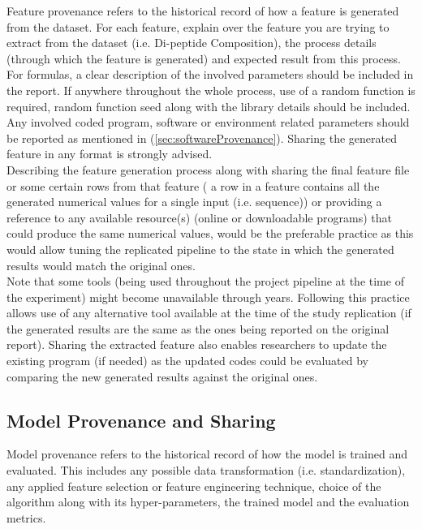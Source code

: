    Feature provenance refers to the historical record of how a feature is generated from the dataset. For each feature, explain 
    over the feature you are trying to extract from the dataset (i.e. Di-peptide Composition), the process details (through which the 
    feature is generated) and expected result from this process. For formulas, a clear description of the involved parameters should be 
    included in the report. If anywhere throughout the whole process, use of a random function is required, random function seed along 
    with the library details should be included. 
    Any involved coded program, software or environment related parameters should be reported as mentioned in 
    (\ref{sec:softwareProvenance}). Sharing the generated feature in any format is strongly advised.\\
    
    Describing the feature generation process along with sharing the final feature file or some certain rows from that feature ( a row 
    in a feature contains all the generated numerical values for a single input (i.e. sequence)) or providing a reference to any available 
    resource(s) (online or downloadable programs) that could produce the same numerical values, 
    would be the preferable practice as this would allow tuning the replicated pipeline to the state in which the generated results 
    would match the original ones. \\
    
    Note that some tools (being used throughout the project pipeline at the time of the experiment) might become unavailable through years. 
    Following this practice allows use of any alternative tool available at the time of the study replication (if the generated results are 
    the same as the ones being reported on the original report). Sharing the extracted feature also enables researchers to update the existing 
    program (if needed) as the updated codes could be evaluated by comparing the new generated results against the original ones.
    
\subsection{Model Provenance and Sharing}

    Model provenance refers to the historical record of how the model is trained and evaluated. This includes any possible 
    data transformation (i.e. standardization), any applied feature selection or feature engineering technique, choice of 
    the algorithm along with its hyper-parameters, the trained model and the evaluation metrics.\\
    
